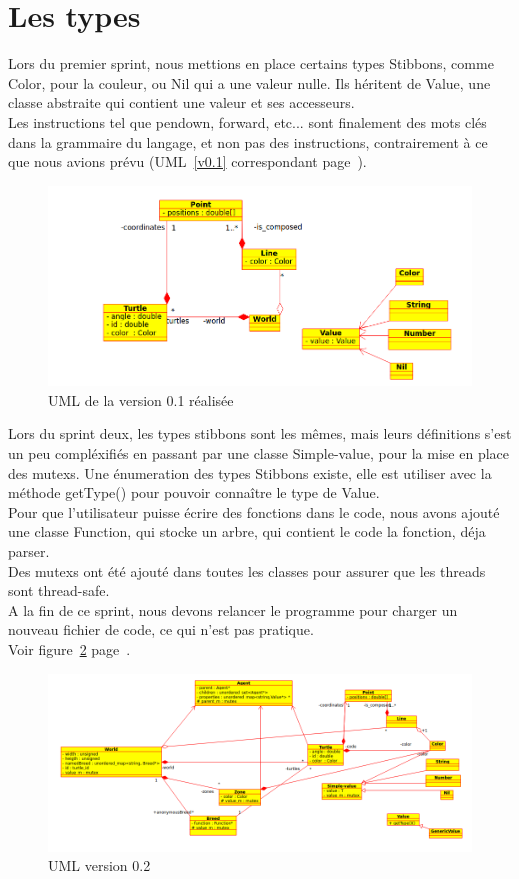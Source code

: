 \section{Les types}
Lors du premier sprint, nous mettions en place certains types Stibbons, comme Color, pour la couleur, ou Nil qui a une valeur nulle. Ils héritent de Value, une classe abstraite qui contient une valeur et ses accesseurs.\\
Les instructions tel que pendown, forward, etc... sont finalement des mots clés dans la grammaire du langage, et non pas des instructions, contrairement à ce que nous avions prévu (UML~\ref{v0.1} correspondant page~\pageref{v0.1}).\\


\begin{figure}[h]
\caption{\label{v0.1R} UML de la version 0.1 réalisée}
\includegraphics[scale=0.5]{doc/report/uml/v01reel.png}
\end{figure}

Lors du sprint deux, les types stibbons sont les mêmes, mais leurs définitions s'est un peu compléxifiés en passant par une classe Simple-value, pour la mise en place des mutexs. Une énumeration des types Stibbons existe, elle est utiliser avec la méthode getType() pour pouvoir connaître le type de Value.\\
Pour que l'utilisateur puisse écrire des fonctions dans le code, nous avons ajouté une classe Function, qui stocke un arbre, qui contient le code la fonction, déja parser.
\\ Des mutexs ont été ajouté dans toutes les classes pour assurer que les threads sont thread-safe.\\
A la fin de ce sprint, nous devons relancer le programme pour charger un nouveau fichier de code, ce qui n'est pas pratique.\\
Voir figure~\ref{v0.2} page~\pageref{v0.2}.
\begin{figure}[h]
\caption{\label{v0.2} UML version 0.2}
\includegraphics[scale=0.45]{doc/report/uml/v02reel.png}
\end{figure}

